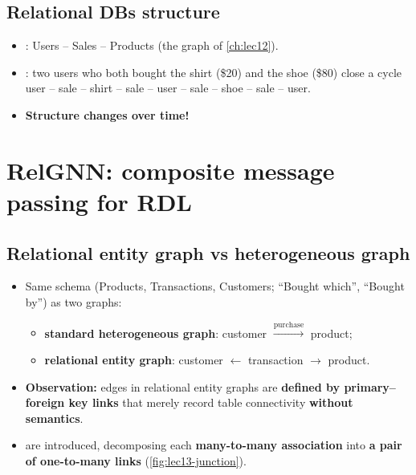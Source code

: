 \subsection{Relational DBs structure}\label{sec:lec13-patterns}

\begin{itemize}
  \item {}: Users -- Sales -- Products (the graph of
    \cref{ch:lec12}).
  \item {}: two users who both bought the shirt (\$20) and the shoe
    (\$80) close a cycle user -- sale -- shirt -- sale -- user -- sale -- shoe -- sale --
    user.
  \item \textbf{Structure changes over time!}
\end{itemize}

\section{RelGNN: composite message passing for RDL}\label{sec:lec13-relgnn}

\subsection{Relational entity graph vs heterogeneous graph}\label{sec:lec13-junction}

\begin{itemize}
  \item Same schema (Products, Transactions, Customers; ``Bought which'', ``Bought by'')
    as two graphs:
    \begin{itemize}
      \item \textbf{standard heterogeneous graph}: customer $\xrightarrow{\text{purchase}}$
        product;
      \item \textbf{relational entity graph}: customer $\leftarrow$ transaction $\to$
        product.
    \end{itemize}
  \item \textbf{Observation:} edges in relational entity graphs are \textbf{defined by
    primary--foreign key links} that merely record table connectivity \textbf{without
    semantics}.
  \item {} are introduced, decomposing each \textbf{many-to-many
    association} into \textbf{a pair of one-to-many links}
    (\cref{fig:lec13-junction}).
\end{itemize}

